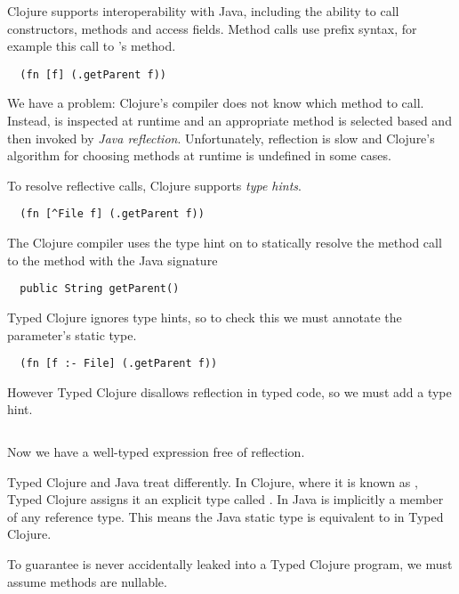 Clojure supports interoperability with Java, including the ability to
call constructors, methods and access fields.
Method calls use prefix syntax, for example this call to 
's  method.

\begin{verbatim}
  (fn [f] (.getParent f))
\end{verbatim}

We have a problem: Clojure's compiler does not know which method to call.
Instead,  is inspected at runtime and an appropriate method is selected based
and then invoked by \emph{Java reflection}.
Unfortunately, reflection is slow and Clojure's algorithm for
choosing methods at runtime is undefined in some cases.

To resolve reflective calls, Clojure supports \emph{type hints}.

\begin{verbatim}
  (fn [^File f] (.getParent f))
\end{verbatim}

The Clojure compiler uses the type hint on 
to statically resolve the method call to the 
method with the Java signature

\begin{verbatim}
  public String getParent()
\end{verbatim}

Typed Clojure ignores type hints, so to check this we must
annotate the parameter's static type.

\begin{verbatim}
  (fn [f :- File] (.getParent f))
\end{verbatim}

However Typed Clojure disallows reflection in typed code, so we
must add a type hint.

\inputminted[firstline=10,lastline=10]{clojure}{code/demo/src/demo/parent3.clj}

Now we have a well-typed expression free of reflection.

Typed Clojure and Java treat  differently.
In Clojure, where it is known as , Typed Clojure assigns it an explicit type
called . In Java  is implicitly a member of any reference type.
This means the Java static type  is equivalent to
 in Typed Clojure.

To guarantee  is never accidentally leaked into a Typed Clojure program,
we must assume methods are nullable.

